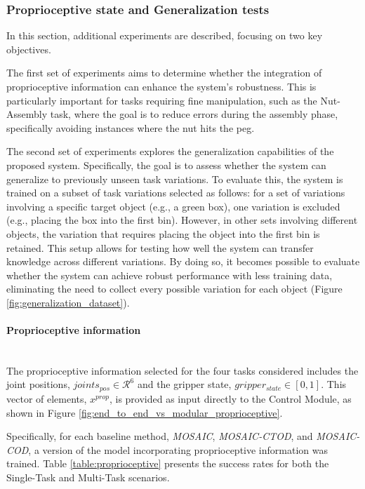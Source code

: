 \subsubsection{Proprioceptive state and Generalization tests}



In this section, additional experiments are described, focusing on two key objectives.

The first set of experiments aims to determine whether the integration of proprioceptive information can enhance the system's robustness. This is particularly important for tasks requiring fine manipulation, such as the Nut-Assembly task, where the goal is to reduce errors during the assembly phase, specifically avoiding instances where the nut hits the peg.

The second set of experiments explores the generalization capabilities of the proposed system. Specifically, the goal is to assess whether the system can generalize to previously unseen task variations. To evaluate this, the system is trained on a subset of task variations selected as follows: for a set of variations involving a specific target object (e.g., a green box), one variation is excluded (e.g., placing the box into the first bin). However, in other sets involving different objects, the variation that requires placing the object into the first bin is retained. This setup allows for testing how well the system can transfer knowledge across different variations. By doing so, it becomes possible to evaluate whether the system can achieve robust performance with less training data, eliminating the need to collect every possible variation for each object (Figure \ref{fig:generalization_dataset}).


\paragraph*{Proprioceptive information}\mbox{}\\
The proprioceptive information selected for the four tasks considered includes the joint positions, $joints_{pos} \in \mathcal{R}^{6}$ and the gripper state, $gripper_{state} \in \left[ 0, 1 \right]$. This vector of elements, $x^{prop}$, is provided as input directly to the Control Module, as shown in Figure \ref{fig:end_to_end_vs_modular_proprioceptive}. 

Specifically, for each baseline method, \textit{MOSAIC}, \textit{MOSAIC-CTOD}, and \textit{MOSAIC-COD}, a version of the model incorporating proprioceptive information was trained. Table \ref{table:proprioceptive} presents the success rates for both the Single-Task and Multi-Task scenarios. 

